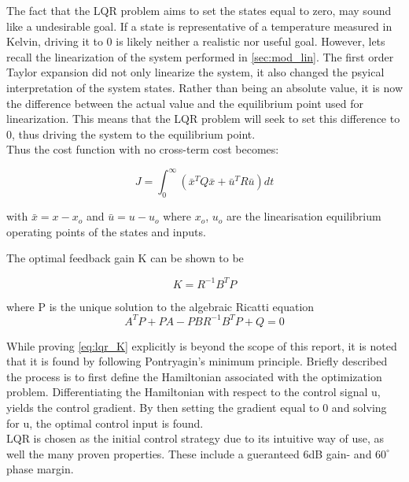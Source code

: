 The fact that the LQR problem aims to set the states equal to zero, may sound like a undesirable goal. If a state is representative of a temperature measured in Kelvin, driving it to 0 is likely neither a realistic nor useful goal. However, lets recall the linearization of the system performed in \cref{sec:mod_lin}. The first order Taylor expansion did not only linearize the system, it also changed the psyical interpretation of the system states. Rather than being an absolute value, it is now the difference between the actual value and the equilibrium point used for linearization. This means that the LQR problem will seek to set this difference to 0, thus driving the system to the equilibrium point.\\

Thus the cost function with no cross-term cost becomes:

\begin{equation} \label{eq:lqr_cost_fcn}
	J = \int_0^{\infty} \left( \bar{x}^TQ\bar{x} + \bar{u}^TR\bar{u} \right)dt
\end{equation}

with $\bar{x} = x-x_o$ and $\bar{u} = u-u_o$ where $x_o$, $u_o$ are the linearisation equilibrium operating points of the states and inputs.

The optimal feedback gain K can be shown to be

\begin{equation} \label{eq:lqr_K}
	K = R^{-1}B^{T}P
\end{equation}

where P is the unique solution to the algebraic Ricatti equation 
\begin{equation} \label{eq:ricatti}
	A^TP + PA - PBR^{-1}B^TP+Q = 0
\end{equation}

While proving \cref{eq:lqr_K} explicitly is beyond the scope of this report, it is noted that it is found by following Pontryagin's minimum principle. Briefly described the process is to first define the Hamiltonian associated with the optimization problem. Differentiating the Hamiltonian with respect to the control signal u, yields the control gradient. By then setting the gradient equal to 0 and solving for u, the optimal control input is found.
\\


LQR is chosen as the initial control strategy due to its intuitive way of use, as well the many proven properties. These include a gueranteed 6dB gain- and $60^\circ$ phase margin.

